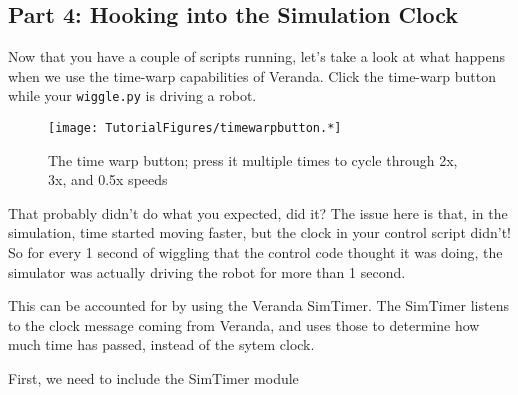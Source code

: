 \begin{Shaded}
\begin{Highlighting}[]
\OperatorTok{=}

\OperatorTok{=} 

\OperatorTok{=} 

\OperatorTok{=}

\OperatorTok{=}

\end{Highlighting}
\end{Shaded}

\hypertarget{part-4-hooking-into-the-simulation-clock}{%
\subsection{Part 4: Hooking into the Simulation
Clock}\label{part-4-hooking-into-the-simulation-clock}}

Now that you have a couple of scripts running, let's take a look at what
happens when we use the time-warp capabilities of Veranda. Click the
time-warp button while your \texttt{wiggle.py} is driving a robot.

\begin{figure}
\centering
\texttt{[image: TutorialFigures/timewarpbutton.*]}
\caption{The time warp button; press it multiple times to cycle through
2x, 3x, and 0.5x speeds}
\end{figure}

That probably didn't do what you expected, did it? The issue here is
that, in the simulation, time started moving faster, but the clock in
your control script didn't! So for every 1 second of wiggling that the
control code thought it was doing, the simulator was actually driving
the robot for more than 1 second.

This can be accounted for by using the Veranda SimTimer. The SimTimer
listens to the clock message coming from Veranda, and uses those to
determine how much time has passed, instead of the sytem clock.

First, we need to include the SimTimer module

\begin{Shaded}
\begin{Highlighting}[]
\end{Highlighting}
\end{Shaded}

